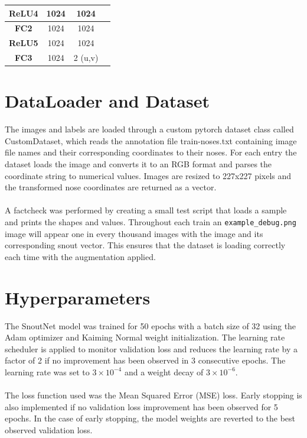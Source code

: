 \documentclass[letterpaper,11pt]{article}
\begin{document}
\begin{table}[h]
\begin{tabularx}{\linewidth}{|c|c|c|X|}
    \hline
    \textbf{ReLU4}    & 1024                 & 1024                 &                                                                                                          \\
    \hline
    \textbf{FC2}      & 1024                 & 1024                 &                                                                                                          \\
    \hline
    \textbf{ReLU5}    & 1024                 & 1024                 &                                                                                                          \\
    \hline
    \textbf{FC3}      & 1024                 & 2 (u,v)              &                                                                                                          \\
    \hline
  \end{tabularx}
\end{table}

\section{DataLoader and Dataset}
The images and labels are loaded through a custom pytorch dataset class called CustomDataset, which reads the annotation file train-noses.txt containing image file names and their corresponding coordinates to their noses. For each entry the dataset loads the image and converts it to an RGB format and parses the coordinate string to numerical values. Images are resized to 227x227 pixels and the transformed nose coordinates are returned as a vector.\\
\\
A factcheck was performed by creating a small test script that loads a sample and prints the shapes and values. Throughout each train an \verb+example_debug.png+ image will appear one in every thousand images with the image and its corresponding snout vector. This ensures that the dataset is loading correctly each time with the augmentation applied.

\section{Hyperparameters}
The SnoutNet model was trained for 50 epochs with a batch size of 32 using the Adam optimizer and Kaiming Normal weight initialization. The learning rate scheduler is applied to monitor validation loss and reduces the learning rate by a factor of 2 if no improvement has been observed in 3 consecutive epochs. The learning rate was set to $3\times10^{-4}$ and a weight decay of $3\times10^{-6}$. \\
\\
The loss function used was the Mean Squared Error (MSE) loss. Early stopping is also implemented if no validation loss improvement has been observed for 5 epochs. In the case of early stopping, the model weights are reverted to the best observed validation loss.
\end{document}
